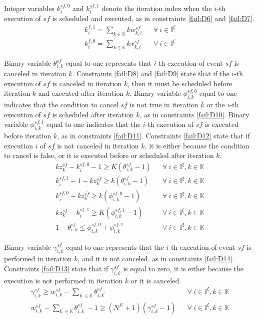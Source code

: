 \documentclass[]{interact}
\theoremstyle{plain}%
\theoremstyle{definition}
\theoremstyle{remark}
\begin{document}
Integer variables $k^{sf,0}_i$ and $k^{sf,1}_{i}$ denote the iteration index when the $i$-th execution of ${sf}$ is scheduled and executed, as in constraints \eqref{fail:D6} and \eqref{fail:D7}. 
\begin{eqnarray}
k^{f,1}_i=\sum_{k\in\mathbb{K}}kw^{sf}_{k,i}&&\forall\ i\in \mathbb{I}^{\xi}\label{fail:D6}\\
k^{f,0}_i=\sum_{k\in\mathbb{K}}kx^{sf}_{k,i}&&\forall\ i\in \mathbb{I}^{\xi}\label{fail:D7}
\end{eqnarray}

Binary variable $\theta^{sf}_{i,k}$ equal to one represents that $i$-th execution of event ${sf}$ is canceled in iteration $k$. Constraints \eqref{fail:D8} and \eqref{fail:D9} state that if the $i$-th execution of ${sf}$ is canceled in iteration $k$, then it must be scheduled before iteration $k$ and executed after iteration $k$. Binary variable $\phi^{sf,0}_{i,k}$ equal to one indicates that the condition to cancel ${sf}$ is not true in iteration $k$ or the $i$-th execution of ${sf}$ is scheduled after iteration $k$, as in constraints \eqref{fail:D10}. Binary variable $\phi^{sf,1}_{i,k}$ equal to one indicates that the $i$-th execution of ${sf}$ is executed before iteration $k$, as in constraints \eqref{fail:D11}. Constraints \eqref{fail:D12} state that if execution $i$ of ${sf}$ is not canceled in iteration $k$, it is either because the condition to cancel is false, or it is executed before or scheduled after iteration $k$. 
\begin{eqnarray}
kz^{\bar{sf}}_k -k^{sf,0}_i - 1 \ge K(\theta^{sf}_{i,k}-1)&&\forall\ i\in \mathbb{I}^{\xi},k\in \mathbb{K}\label{fail:D8}\\
k^{sf,1}_i - 1 - kz^{\bar{sf}}_k \ge k(\theta^{sf}_{i,k}-1)&&\forall\  i\in \mathbb{I}^{\xi},k\in \mathbb{K}\label{fail:D9}\\
k^{sf,0}_i - kz^{\bar{sf}}_k \ge k(\phi^{sf,0}_{i,k}-1)&&\forall\ i\in \mathbb{I}^{\xi},k\in \mathbb{K}\label{fail:D10}\\
kz^{\bar{sf}}_k - k^{sf,1}_i \ge K(\phi^{sf,1}_{i,k}-1)&&\forall\ i\in \mathbb{I}^{\xi},k\in \mathbb{K}\label{fail:D11}\\
1-\theta^{sf}_{i,k} \le \phi^{sf,0}_{i,k} + \phi^{sf,1}_{i,k}&&\forall\ i\in \mathbb{I}^{\xi},k\in \mathbb{K}\label{fail:D12}
\end{eqnarray}

Binary variable $\gamma^{sf}_{i,k}$ equal to one represents that the $i$-th execution of event $sf$ is performed in iteration $k$, and it is not canceled, as in constraints \eqref{fail:D14}. Constraints \eqref{fail:D13} state that if $\gamma^{sf}_{i,k}$ is equal to zero, it is either because the execution is not performed in iteration $k$ or it is canceled. 
\begin{eqnarray}
\gamma^{sf}_{i,k} \ge w^{sf}_{i,k} - \sum_{k^{'}\in \mathbb{K}}\theta^{sf}_{i,k^{'}}&&\forall\ i\in \mathbb{I}^{\xi},k\in \mathbb{K}\label{fail:D13}\\
w^{sf}_{i,k} - \sum_{k^{'}\in \mathbb{K}}\theta^{sf}_{i,k^{'}} -1 \ge (N^{fl}+1)(\gamma^{sf}_{i,k}-1) &&\forall\ i\in \mathbb{I}^{\xi},k\in \mathbb{K}\label{fail:D14}
\end{eqnarray}
\end{document}
